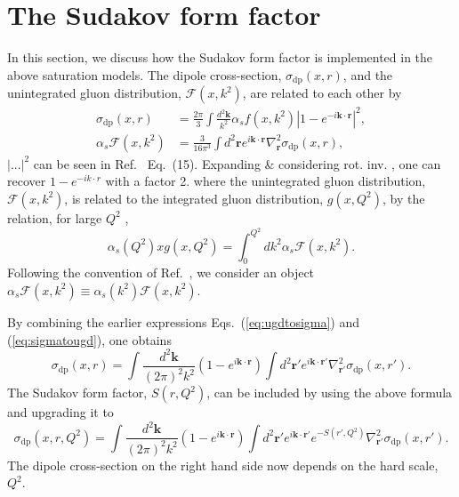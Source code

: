 \documentclass[11pt]{article}
\newcommand{\pairdot}[2]{ \mathbf{#1}\cdot\mathbf{#2}  }
\begin{document}
\section{The Sudakov form factor }
In this section, we discuss how the Sudakov form factor is implemented in the above saturation models.%
The dipole cross-section, $\sigma_{\mathrm{dp}}(x, r) $, and the unintegrated gluon distribution, $\mathcal{F}(x,k^2)$, are related to each other by %
\cite{bgk2002}
\begin{align} 
\sigma_{\mathrm{dp}}(x,r) &= \frac{2 \pi}{3} \int\frac{d^2 \mathbf{k} }{k^2} \alpha_s f(x, k^2) |1-e^{-i \pairdot{k}{r}}|^2,
\label{eq:ugdtosigma}\\
\alpha_s \mathcal{F}(x,k^2) &= \frac{3 }{16 \pi^3}\int d^2 \mathbf{r} e^{i \pairdot{k}{r}}  \nabla^2_{\mathbf{r}} \sigma_{\mathrm{dp}}(x,r),
\label{eq:sigmatougd}
\end{align}
{\color{blue} $|...|^2$ can be seen in Ref.~\cite{bgk2002} Eq.~(15). Expanding \& considering rot. inv. , one can recover $1-e^{-ik\cdot r} $ with a factor 2.} 
where the unintegrated gluon distribution, $\mathcal{F}(x,k^2)$, is related to the integrated gluon distribution, $g(x,Q^2)$, by the relation, for large $Q^2$ \cite{bgk2002},%
\begin{equation}
\alpha_s(Q^2) x g(x,Q^2)=\int^{Q^2}_{0} d k^2 \alpha_s \mathcal{F}(x,k^2).
\end{equation}
Following the convention of Ref.~\cite{bgk2002}, we consider an object $\alpha_s\mathcal{F}(x,k^2)\equiv\alpha_s(k^2)\mathcal{F}(x,k^2)$.

By combining the earlier expressions Eqs.~(\ref{eq:ugdtosigma}) and (\ref{eq:sigmatougd}), one obtains
\begin{equation}
\sigma_{\mathrm{dp}}(x,r) =\int \frac{d^2 \mathbf{k}}{(2\pi)^2k^2}\left( 1- e^{i \pairdot{k}{r}}\right) \int d^2 \mathbf{{r'} } e^{i\pairdot{k}{{r'} }}\nabla^2_{\mathbf{{r'} }}\sigma_{\mathrm{dp}}(x,{r'} ).
\label{eq:dptodp}
\end{equation}
The Sudakov form factor, $S(r,Q^2)$, can be included by using the above formula and upgrading it to
\cite{xiao2017}
\begin{equation}
\sigma_{\mathrm{dp}}(x,r,Q^2) =\int \frac{d^2 \mathbf{k}}{(2\pi)^2 k^2} \left( 1- e^{i \pairdot{k}{r}}\right) \int d^2 \mathbf{ {r'} } e^{i\pairdot{k}{{r'} }}e^{-S({r'} ,Q^2)} \nabla^2_{\mathbf{{r'} }}\sigma_{\mathrm{dp}}(x,{r'} ).
\end{equation}
The dipole cross-section on the right hand side now depends on the hard scale, $Q^2$.
\end{document}
